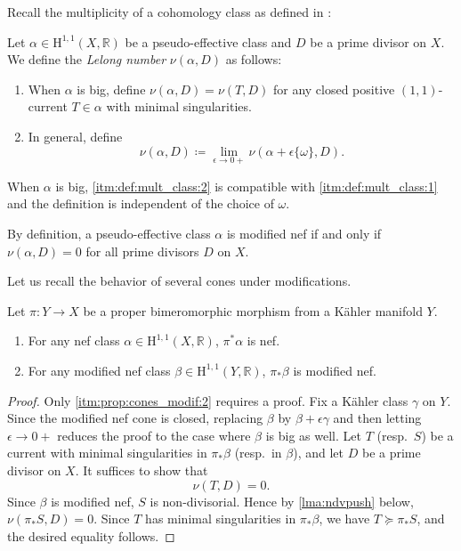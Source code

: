 Recall the multiplicity of a cohomology class as defined in \cite[Section~2.1.3]{Bou02}:
\begin{definition}\label{def:mult_class}
    Let $\alpha\in \mathrm{H}^{1,1}(X,\mathbb{R})$ be a pseudo-effective class and $D$ be a prime divisor on $X$. We define the \emph{Lelong number} $\nu(\alpha,D)$ as follows:
    \begin{enumerate}
        \item\label{itm:def:mult_class:1} When $\alpha$ is big, define $\nu(\alpha,D)=\nu(T,D)$ for any closed positive $(1,1)$-current $T\in \alpha$ with minimal singularities.
        \item\label{itm:def:mult_class:2} In general, define
        \[
        \nu(\alpha,D)\coloneqq \lim_{\epsilon\to 0+}\nu(\alpha+\epsilon \{\omega\},D).
        \]
    \end{enumerate}
\end{definition}
When $\alpha$ is big, \ref{itm:def:mult_class:2} is compatible with \ref{itm:def:mult_class:1} and the definition is independent of the choice of $\omega$.

By definition, a pseudo-effective class $\alpha$ is modified nef if and only if $\nu(\alpha,D)=0$ for all prime divisors $D$ on $X$.


Let us recall the behavior of several cones under modifications.
\begin{proposition}\label{prop:cones_modif}
    Let $\pi\colon Y\rightarrow X$ be a proper bimeromorphic morphism from a Kähler manifold $Y$.
    \begin{enumerate}
        \item\label{itm:prop:cones_modif:1} For any nef class $\alpha\in \mathrm{H}^{1,1}(X,\mathbb{R})$, $\pi^*\alpha$ is nef.
        \item\label{itm:prop:cones_modif:2} For any modified nef class $\beta\in \mathrm{H}^{1,1}(Y,\mathbb{R})$, $\pi_*\beta$ is modified nef.
    \end{enumerate}
\end{proposition}

\begin{proof}
    Only \ref{itm:prop:cones_modif:2} requires a proof. Fix a Kähler class $\gamma$ on $Y$. Since the modified nef cone is closed, replacing $\beta$ by $\beta+\epsilon\gamma$ and then letting $\epsilon\to 0+$ reduces the proof to the case where $\beta$ is big as well. Let $T$ (resp.\ $S$) be a current with minimal singularities in $\pi_*\beta$ (resp.\ in $\beta$), and let $D$ be a prime divisor on $X$. It suffices to show that
    \[
    \nu(T,D)=0.
    \]
    Since $\beta$ is modified nef, $S$ is non-divisorial. Hence by \cref{lma:ndvpush} below, $\nu(\pi_*S,D)=0$. Since $T$ has minimal singularities in $\pi_*\beta$, we have $T\succeq \pi_*S$, and the desired equality follows.
\end{proof}

